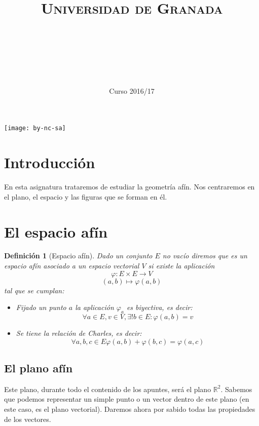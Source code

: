 \documentclass[11pt, a4paper, titlepage]{article}
\title{
  \normalfont \normalsize
  \textsc{Universidad de Granada} \\ [25pt]    %
  \horrule{0.5pt} \\[0.4cm] %
  \huge \subject\\ %
  \horrule{2pt} \\[0.5cm] %
}
\author{\Large{\docauthor}}
\date{\vspace{-1.5em} \normalsize Curso 2016/17}
\newcommand{\R}{\mathbb{R}}
\theoremstyle{theorem-style}
\theoremstyle{definition-style}
\newtheorem*{ndef}{Definición}
\theoremstyle{remark-style}
\theoremstyle{example-style}
\begin{document}
\maketitle  %
\tableofcontents    %
\vfill
\begin{center}
\texttt{[image: by-nc-sa]}  %
\end{center}
\newpage


\section*{Introducción}
En esta asignatura trataremos de estudiar la geometría afín. Nos centraremos en el plano, el espacio y las figuras que se forman en él.
\newpage

\section{El espacio afín}
\begin{ndef}[Espacio afín]
Dado un conjunto $E$ no vacío diremos que es un espacio afín asociado a un espacio vectorial $V$ si existe la aplicación
$$\varphi: E \times E \rightarrow V$$
$$(a,b) \mapsto \varphi(a,b)$$
tal que se cumplan:
\begin{itemize}
\item Fijado un punto $a$ la aplicación $\varphi_a$ es biyectiva, es decir:
$$\forall a \in E, v \in V, \exists! b \in E:\varphi(a,b)=v$$
\item Se tiene la relación de Charles, es decir:
$$\forall a, b, c \in E \varphi(a,b) + \varphi(b,c) = \varphi(a,c)$$
\end{itemize}
\end{ndef}
\subsection{El plano afín}
Este plano, durante todo el contenido de los apuntes, será el plano $\R^2$. Sabemos que podemos representar un simple punto o un vector dentro de este plano (en este caso, es el plano vectorial). Daremos ahora por sabido todas las propiedades de los vectores.

\end{document}
